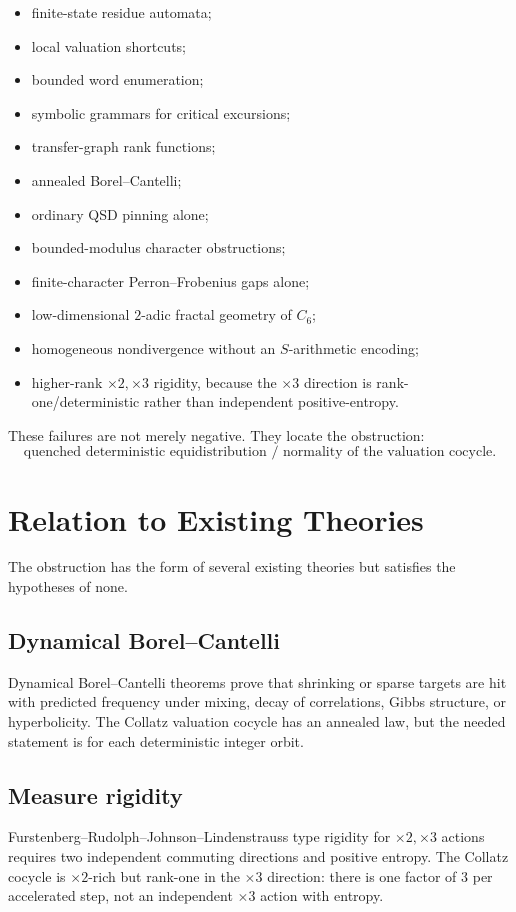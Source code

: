 \documentclass[11pt]{article}
\begin{document}
\begin{itemize}[leftmargin=2em]
\item finite-state residue automata;
\item local valuation shortcuts;
\item bounded word enumeration;
\item symbolic grammars for critical excursions;
\item transfer-graph rank functions;
\item annealed Borel--Cantelli;
\item ordinary QSD pinning alone;
\item bounded-modulus character obstructions;
\item finite-character Perron--Frobenius gaps alone;
\item low-dimensional $2$-adic fractal geometry of $C_6$;
\item homogeneous nondivergence without an $S$-arithmetic encoding;
\item higher-rank $\times2,\times3$ rigidity, because the $\times3$ direction is rank-one/deterministic rather than independent positive-entropy.
\end{itemize}

These failures are not merely negative.  They locate the obstruction:
\[
\boxed{\text{quenched deterministic equidistribution / normality of the valuation cocycle}.}
\]

\section{Relation to Existing Theories}

The obstruction has the form of several existing theories but satisfies the hypotheses of none.

\subsection{Dynamical Borel--Cantelli}
Dynamical Borel--Cantelli theorems prove that shrinking or sparse targets are hit with predicted frequency under mixing, decay of correlations, Gibbs structure, or hyperbolicity.  The Collatz valuation cocycle has an annealed law, but the needed statement is for each deterministic integer orbit.

\subsection{Measure rigidity}
Furstenberg--Rudolph--Johnson--Lindenstrauss type rigidity for $\times2,\times3$ actions requires two independent commuting directions and positive entropy.  The Collatz cocycle is $\times2$-rich but rank-one in the $\times3$ direction: there is one factor of $3$ per accelerated step, not an independent $\times3$ action with entropy.
\end{document}
